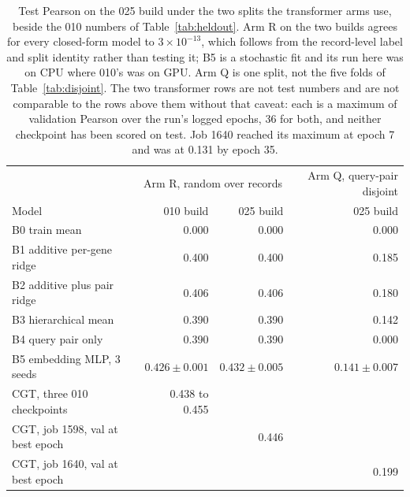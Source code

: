 \begin{table}[htbp]
\centering
\begin{tabular}{lrrr}
\hline
& \multicolumn{2}{c}{Arm R, random over records} & Arm Q, query-pair disjoint \\
Model & 010 build & 025 build & 025 build \\
\hline
B0 train mean & 0.000 & 0.000 & 0.000 \\
B1 additive per-gene ridge & 0.400 & 0.400 & 0.185 \\
B2 additive plus pair ridge & 0.406 & 0.406 & 0.180 \\
B3 hierarchical mean & 0.390 & 0.390 & 0.142 \\
B4 query pair only & 0.390 & 0.390 & 0.000 \\
B5 embedding MLP, 3 seeds & $0.426 \pm 0.001$ & $0.432 \pm 0.005$ & $0.141 \pm 0.007$ \\
CGT, three 010 checkpoints & 0.438 to 0.455 & & \\
CGT, job 1598, val at best epoch & & 0.446 & \\
CGT, job 1640, val at best epoch & & & 0.199 \\
\hline
\end{tabular}
\caption{Test Pearson on the 025 build under the two splits the transformer arms
use, beside the 010 numbers of Table~\ref{tab:heldout}. Arm R on the two builds
agrees for every closed-form model to $3 \times 10^{-13}$, which follows from
the record-level label and split identity rather than testing it; B5 is a
stochastic fit and its run here was on CPU where 010's was on GPU. Arm Q is
one split, not the five folds of Table~\ref{tab:disjoint}. The two transformer
rows are not test numbers and are not comparable to the rows above them without
that caveat: each is a maximum of validation Pearson over the run's logged
epochs, 36 for both, and neither checkpoint has been scored on test. Job 1640
reached its maximum at epoch 7 and was at 0.131 by epoch 35.}
\label{tab:disjoint025}
\end{table}


